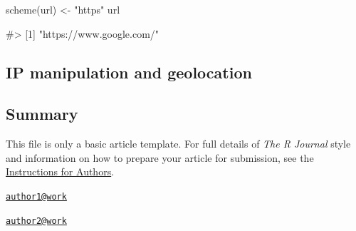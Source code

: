 \begin{Schunk}
\begin{Sinput}
scheme(url) <- "https"
url
\end{Sinput}
\begin{Soutput}
#> [1] "https://www.google.com/"
\end{Soutput}
\end{Schunk}

\subsection{IP manipulation and
geolocation}\label{ip-manipulation-and-geolocation}

\subsection{Summary}\label{summary}

This file is only a basic article template. For full details of
\emph{The R Journal} style and information on how to prepare your
article for submission, see the
\href{http://journal.r-project.org/latex/RJauthorguide.pdf}{Instructions
for Authors}.



\address{
Oliver Keyes\\
Wikimedia Foundation\\
line 1\\ line 2\\
}
\href{mailto:author1@work}{\nolinkurl{author1@work}}

\address{
Bob Rudis\\
Rapid7\\
line 1\\ line 2\\
}
\href{mailto:author2@work}{\nolinkurl{author2@work}}

